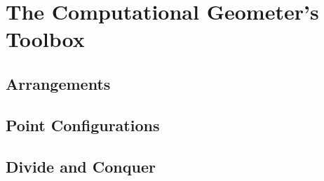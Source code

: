 \part{The Computational Geometer's Toolbox}\label{sec:preliminaries}


\chapter{Arrangements}


\chapter{Point Configurations}


\chapter{Divide and Conquer}






